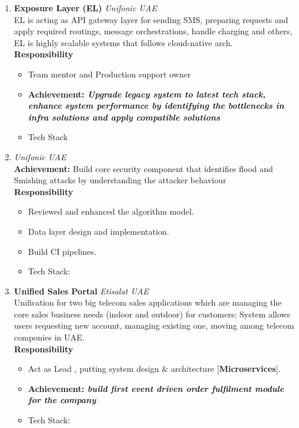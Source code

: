 \documentclass[%
               doublesided,
               paper=a4,
               fontsize=10pt
              ]{my-resume}
\begin{document}
\begin{enumerate}
		\item 
		\textbf{\color{cyan}Exposure Layer (EL) \faCogs} \hfill \textit{Unifonic UAE \faMapMarker} \\
		EL is acting as API gateway layer for sending SMS, preparing requests and apply required routings, message orchestrations, handle charging and others, EL is highly scalable systems that follows cloud-native arch.	\\
		\textbf{Responsibility} 
		\begin{itemize}
			\item Team mentor and Production support owner
			\item \textbf{Achievement: \textit{Upgrade legacy system to latest tech stack, enhance system performance by identifying the bottlenecks in infra solutions and apply compatible solutions}} 
			\item 
			\color{accent} {Tech Stack} 
		\end{itemize}
		
		\item 
		\textbf{\color{cyan}{Fraud Detection System} \faSearch} \hfill \textit{Unifonic UAE \faMapMarker} \\
		  \textbf{Achievement:} Build core security component that identifies flood and Smishing attacks by understanding the attacker behaviour \\
		\textbf{Responsibility} 
		\begin{itemize}
			\setlength\itemsep{.0001em}
			\item Reviewed and enhanced the algorithm model.
			\item Data layer design and implementation.
			\item Build CI pipelines.
			\item \color{accent} Tech Stack: 
		\end{itemize}
		
		
		\item \textbf{\color{cyan}Unified Sales Portal \faMoney} \hfill \textit{Etisalat UAE \faMapMarker} \\
		Unification for two big telecom sales applications which are managing the core sales business needs (indoor and outdoor) for customers; System allows users requesting new account, managing existing one, moving among telecom componies in UAE.\\
		\textbf{Responsibility} 
		\begin{itemize}
			\setlength\itemsep{.0001em}
			\item Act as Lead , putting system design \& architecture  \hfill [\textbf{\color{black}Microservices}].
			\item \textbf{Achievement: \textit{build first event driven order fulfilment module for the company}}
			\item \color{accent} Tech Stack: 
		\end{itemize}
		

\end{enumerate}
\end{document}
